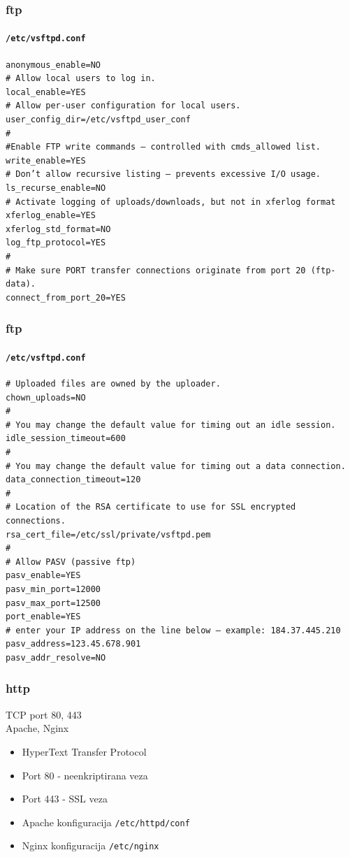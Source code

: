 \documentclass[t,table,usenames,dvipsnames]{beamer}
\begin{document}
\begin{frame}[fragile]
	\frametitle{ftp}
	\framesubtitle{\texttt{/etc/vsftpd.conf}}
	\scriptsize
	\begin{verbatim}
anonymous_enable=NO
# Allow local users to log in.
local_enable=YES
# Allow per-user configuration for local users.
user_config_dir=/etc/vsftpd_user_conf
#
#Enable FTP write commands – controlled with cmds_allowed list.
write_enable=YES
# Don’t allow recursive listing – prevents excessive I/O usage.
ls_recurse_enable=NO
# Activate logging of uploads/downloads, but not in xferlog format
xferlog_enable=YES
xferlog_std_format=NO
log_ftp_protocol=YES
#
# Make sure PORT transfer connections originate from port 20 (ftp-data).
connect_from_port_20=YES
	\end{verbatim}

\end{frame}


\begin{frame}[fragile]
	\frametitle{ftp}
	\framesubtitle{\texttt{/etc/vsftpd.conf}}
	\scriptsize
	\begin{verbatim}
# Uploaded files are owned by the uploader.
chown_uploads=NO
#
# You may change the default value for timing out an idle session.
idle_session_timeout=600
#
# You may change the default value for timing out a data connection.
data_connection_timeout=120
#
# Location of the RSA certificate to use for SSL encrypted connections.
rsa_cert_file=/etc/ssl/private/vsftpd.pem
#
# Allow PASV (passive ftp)
pasv_enable=YES
pasv_min_port=12000
pasv_max_port=12500
port_enable=YES
# enter your IP address on the line below – example: 184.37.445.210
pasv_address=123.45.678.901
pasv_addr_resolve=NO
	\end{verbatim}


\end{frame}







\begin{frame}
	\frametitle{http}
	
	TCP port 80, 443\\
	Apache, Nginx
	
	\begin{itemize}
		\item[] HyperText Transfer Protocol
		
		\item[] Port 80 - neenkriptirana veza
		\item[] Port 443 - SSL veza
	\end{itemize}
	
	\begin{itemize}
		\item[] Apache konfiguracija \texttt{/etc/httpd/conf}
		\item[] Nginx konfiguracija \texttt{/etc/nginx}
	\end{itemize}

\end{frame}
\end{document}
